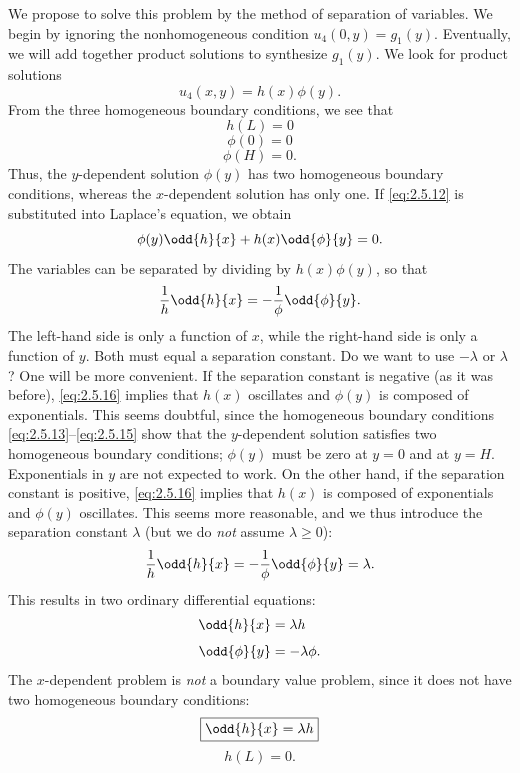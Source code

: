 We propose to solve this problem by the method of separation of variables. We begin by ignoring the nonhomogeneous condition $u_4(0,y) = g_1(y)$. Eventually, we will add together product solutions to synthesize $g_1(y)$. We look for product solutions
\begin{equation}
\label{eq:2.5.12}
u_4(x,y) = h(x)\phi(y).
\end{equation}
From the three homogeneous boundary conditions, we see that
\begin{equation}
\label{eq:2.5.13}
h(L) = 0
\end{equation}
\begin{equation}
\label{eq:2.5.14}
\phi(0) = 0
\end{equation}
\begin{equation}
\label{eq:2.5.15}
\phi(H) = 0.
\end{equation}
Thus, the $y$-dependent solution $\phi(y)$ has two homogeneous boundary conditions, whereas the $x$-dependent solution has only one. If \eqref{eq:2.5.12} is substituted into Laplace's equation, we obtain
\[
\phi(y)\odd{h}{x} + h(x)\odd{\phi}{y} = 0.
\]
The variables can be separated by dividing by $h(x)\phi(y)$, so that
\begin{equation}
\label{eq:2.5.16}
\frac{1}{h}\odd{h}{x} = -\frac{1}{\phi}\odd{\phi}{y}.
\end{equation}
The left-hand side is only a function of $x$, while the right-hand side is only a function of $y$. Both must equal a separation constant. Do we want to use $-\lambda$ or $\lambda$? One will be more convenient. If the separation constant is negative (as it was before), \eqref{eq:2.5.16} implies that $h(x)$ oscillates and $\phi(y)$ is composed of exponentials. This seems doubtful, since the homogeneous boundary conditions \eqref{eq:2.5.13}--\eqref{eq:2.5.15} show that the $y$-dependent solution satisfies two homogeneous boundary conditions; $\phi(y)$ must be zero at $y = 0$ and at $y = H$. Exponentials in $y$ are not expected to work. On the other hand, if the separation constant is positive, \eqref{eq:2.5.16} implies that $h(x)$ is composed of exponentials and $\phi(y)$ oscillates. This seems more reasonable, and we thus introduce the separation constant $\lambda$ (but we do \emph{not} assume $\lambda \ge 0$):
\begin{equation}
\label{eq:2.5.17}
\frac{1}{h}\odd{h}{x} = -\frac{1}{\phi}\odd{\phi}{y} = \lambda.
\end{equation}
This results in two ordinary differential equations:
\begin{align*}
\odd{h}{x} &= \lambda h \\[4pt]
\odd{\phi}{y} &= -\lambda\phi.
\end{align*}
The $x$-dependent problem is \emph{not} a boundary value problem, since it does not have two homogeneous boundary conditions:
\begin{equation}
\label{eq:2.5.18}
\boxed{\odd{h}{x} = \lambda h}
\end{equation}
\begin{equation}
\label{eq:2.5.19}
\boxed{h(L) = 0.}
\end{equation}

